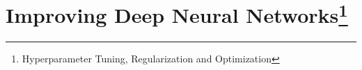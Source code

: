 \chapter[Improving Deep Neural Networks]{Improving Deep Neural Networks\setcounter{footnote}{0}\footnote{Hyperparameter Tuning, Regularization and Optimization}}
